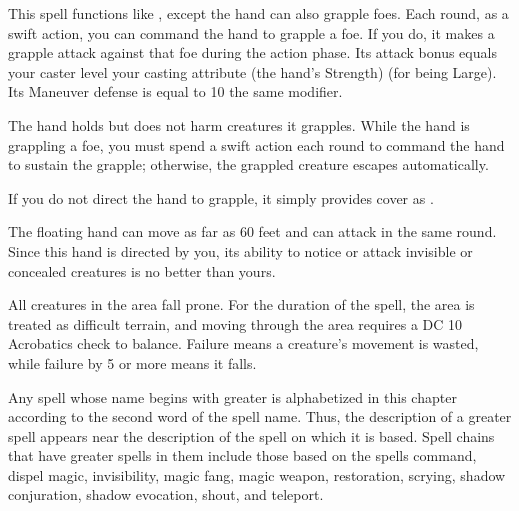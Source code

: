 \begin{spelleffect}
    This spell functions like , except the hand can also grapple foes. Each round, as a swift action, you can command the hand to grapple a foe. If you do, it makes a grapple attack against that foe during the action phase. Its attack bonus equals your caster level \add your casting attribute (the hand's Strength)  (for being Large). Its Maneuver defense is equal to 10 \add the same modifier.
    \par The hand holds but does not harm creatures it grapples. While the hand is grappling a foe, you must spend a swift action each round to command the hand to sustain the grapple; otherwise, the grappled creature escapes automatically.
    \par If you do not direct the hand to grapple, it simply provides cover as .
\end{spelleffect}
\begin{spellnotes}
    The floating hand can move as far as 60 feet and can attack in the same round. Since this hand is directed by you, its ability to notice or attack invisible or concealed creatures is no better than yours.
\end{spellnotes}

\spelldur{\durshort \dismissable}
\begin{spelleffect}
    All creatures in the area fall prone. For the duration of the spell, the area is treated as difficult terrain, and moving through the area requires a DC 10 Acrobatics check to balance. Failure means a creature's movement is wasted, while failure by 5 or more means it falls.
\end{spelleffect}

\par Any spell whose name begins with greater is alphabetized in this chapter according to the second word of the spell name. Thus, the description of a greater spell appears near the description of the spell on which it is based. Spell chains that have greater spells in them include those based on the spells command, dispel magic, invisibility, magic fang, magic weapon, restoration, scrying, shadow conjuration, shadow evocation, shout, and teleport.

